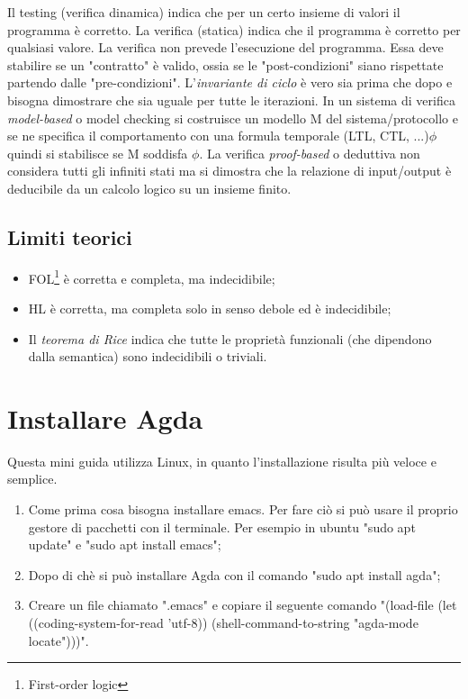 Il testing (verifica dinamica) indica che per un certo insieme di valori il programma è corretto. La verifica (statica) indica che il programma è corretto per qualsiasi valore. 
La verifica non prevede l'esecuzione del programma. Essa deve stabilire se un "contratto" è valido, ossia se le "post-condizioni" siano rispettate partendo dalle "pre-condizioni". L'\textit{invariante di ciclo} è vero sia prima che dopo e bisogna dimostrare che sia uguale per tutte le iterazioni.
In un sistema di verifica \textit{model-based} o model checking si costruisce
 un modello M del sistema/protocollo e se ne specifica il comportamento con una formula temporale (LTL, CTL, ...)$\phi$ quindi si stabilisce se M soddisfa $\phi$.
 La verifica \textit{proof-based} o deduttiva non considera tutti gli infiniti stati ma si dimostra che la relazione di input/output è deducibile da un calcolo logico su un insieme finito.

\subsection{Limiti teorici}

\begin{itemize}
    \item FOL\footnote{First-order logic} è corretta e completa, ma indecidibile;
    \item HL è corretta, ma completa solo in senso debole ed è indecidibile;
    \item Il \textit{teorema di Rice} indica che tutte le proprietà funzionali (che dipendono dalla semantica) sono indecidibili o triviali.
\end{itemize}

\section{Installare Agda}

Questa mini guida utilizza Linux, in quanto l'installazione risulta più veloce e semplice.

\begin{enumerate}
    \item Come prima cosa bisogna installare emacs. Per fare ciò si può usare il proprio gestore di pacchetti con il terminale. Per esempio in ubuntu "sudo apt update" e "sudo apt install emacs";
    \item Dopo di chè si può installare Agda con il comando "sudo apt install agda";
    \item Creare un file chiamato ".emacs" e copiare il seguente comando "(load-file (let ((coding-system-for-read 'utf-8))
(shell-command-to-string "agda-mode locate")))".
\end{enumerate}

